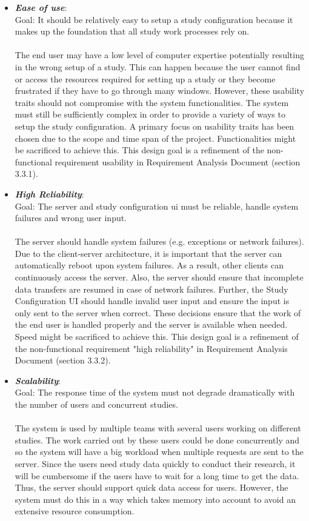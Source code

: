 \begin{itemize}
\item \textit{\bf{Ease of use}}: 
\\
Goal: It should be relatively easy to setup a study configuration because it makes up the foundation that all study work processes rely on. 
\\\\
The end user may have a low level of computer expertise potentially resulting in the wrong setup of a study.  This can happen because the user cannot find or access the resources required for setting up a study or they become frustrated if they have to go through many windows. However, these usability traits should not compromise with the system functionalities. The system must still be sufficiently complex in order to provide a variety of ways to setup the study configuration.  A primary focus on usability traits has been chosen due to the scope and time span of the project. Functionalities might be sacrificed to achieve this. This design goal is a refinement of the non-functional requirement  usability in Requirement Analysis Document  (section 3.3.1). 

\item \textit{\bf{High Reliability}}: 
\\
Goal: The server and study configuration ui must be reliable, handle system failures and wrong user input.
\\\\
The server should handle system failures (e.g. exceptions or network failures). Due to the client-server architecture, it is important that the server can automatically reboot upon system failures. As a result, other clients can continuously access the server. Also, the server should ensure that incomplete data transfers are resumed in case of network failures. Further, the Study Configuration UI should handle invalid user input and ensure the input is only sent to the server when correct. These decisions ensure that the work of the end user is handled properly and the server is available when needed. Speed might be sacrificed to achieve this. This design goal is a refinement of the non-functional requirement "high reliability" in Requirement Analysis Document (section 3.3.2).  

\item \textit{\bf{Scalability}}:
\\
Goal: The response time of the system must not degrade dramatically with the number of users and concurrent studies. 
\\\\
The system is used by multiple teams with several users working on different studies. The work carried out by these users could be done concurrently and so the system will have a big workload when multiple requests are sent to the server. Since the users need study data quickly to conduct their research, it will be cumbersome if the users have to wait for a long time to get the data. Thus, the server should support quick data access for users. However, the system must do this in a way which takes memory into account to avoid an extensive resource consumption.


\end{itemize}
